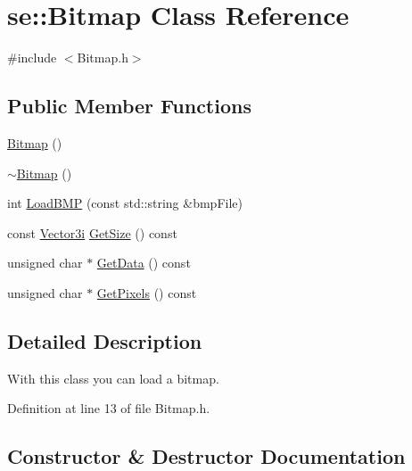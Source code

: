 \hypertarget{classse_1_1_bitmap}{}\section{se\+:\+:Bitmap Class Reference}
\label{classse_1_1_bitmap}


{\ttfamily \#include $<$Bitmap.\+h$>$}

\subsection*{Public Member Functions}
\begin{DoxyCompactItemize}
\item 
\mbox{\hyperlink{classse_1_1_bitmap_a7b43662ae9e5584ee8e3cef244ca32f7}{Bitmap}} ()
\item 
\mbox{\hyperlink{classse_1_1_bitmap_aa098fcae7998e75240e46594fe84996e}{$\sim$\+Bitmap}} ()
\item 
int \mbox{\hyperlink{classse_1_1_bitmap_a76c7fbaf5d2049af44abf83fe40a854d}{Load\+B\+MP}} (const std\+::string \&bmp\+File)
\item 
const \mbox{\hyperlink{namespacese_ada11715de7cf6e87b5dfb4611fe68d29}{Vector3i}} \mbox{\hyperlink{classse_1_1_bitmap_a805adca2ccb528c6e694db84a51c7b66}{Get\+Size}} () const
\item 
unsigned char $\ast$ \mbox{\hyperlink{classse_1_1_bitmap_ac3746b0776fcdee3dfcd1cf51f2ceb4b}{Get\+Data}} () const
\item 
unsigned char $\ast$ \mbox{\hyperlink{classse_1_1_bitmap_a805f18948c75eaad1985520814514c1e}{Get\+Pixels}} () const
\end{DoxyCompactItemize}


\subsection{Detailed Description}
With this class you can load a bitmap. 

Definition at line 13 of file Bitmap.\+h.



\subsection{Constructor \& Destructor Documentation}
\mbox{\label{classse_1_1_bitmap_a7b43662ae9e5584ee8e3cef244ca32f7}} 
